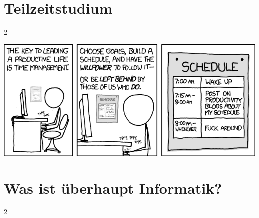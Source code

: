 \documentclass[a4paper,12pt]{scrartcl}
\newcommand{\spaltenanfang}{\begin{multicols}{2}}
\newcommand{\spaltenende}{\end{multicols}}
\begin{document}


%



\newpage
\section{Teilzeitstudium}
\spaltenanfang

\spaltenende


\begin{center}
\includegraphics[scale=0.57]{comics/time_management}
\end{center}



\newpage
\section{Was ist überhaupt Informatik?}
\spaltenanfang




\spaltenende
\end{document}
